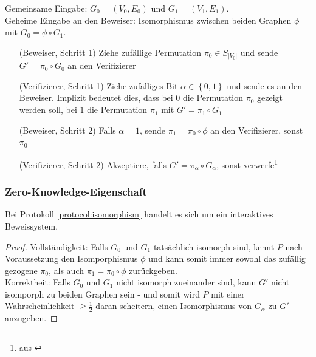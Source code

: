 \begin{protocol}[Graphenisomorphismus]
\label{protocol:isomorphism}
Gemeinsame Eingabe: \( G_0 = \left( V_0, E_0 \right) \) und \( G_1 = \left( V_1, E_1 \right) \).\\
Geheime Eingabe an den Beweiser: Isomorphismus zwischen beiden Graphen \( \phi \) mit \( G_0 = \phi \circ G_1 \).
\begin{itemize}
\item[(Beweiser, Schritt 1)] Ziehe zufällige Permutation \( \pi_0 \in S_{\left| V_0 \right| } \) und sende \( G' = \pi_0 \circ G_0 \) an den Verifizierer
\item[(Verifizierer, Schritt 1)] Ziehe zufälliges Bit \( \alpha \in \left\lbrace 0, 1 \right\rbrace \) und sende es an den Beweiser. Implizit bedeutet dies, dass bei \( 0 \) die Permutation \( \pi_0 \) gezeigt werden soll, bei \( 1 \) die Permutation \( \pi_1 \) mit \( G' = \pi_1 \circ G_1 \)
\item[(Beweiser, Schritt 2)] Falls \( \alpha = 1 \), sende \( \pi_1 = \pi_0 \circ \phi \) an den Verifizierer, sonst \( \pi_0 \)
\item[(Verifizierer, Schritt 2)] Akzeptiere, falls \( G' = \pi_\alpha \circ G_\alpha \), sonst verwerfe\footnote{aus \cite[Protocol 2]{np}}
\end{itemize}
\end{protocol}

\subsubsection{Zero-Knowledge-Eigenschaft}

\begin{theorem}
Bei Protokoll \ref{protocol:isomorphism} handelt es sich um ein interaktives Beweissystem.
\end{theorem}

\begin{proof}
Vollständigkeit: Falls \( G_0 \) und \( G_1 \) tatsächlich isomorph sind, kennt \( P \) nach Voraussetzung den Isomporphismus \( \phi \) und kann somit immer sowohl das zufällig gezogene \( \pi_0 \), als auch \( \pi_1 = \pi_0 \circ \phi \) zurückgeben. \\
Korrektheit: Falls \( G_0 \) und \( G_1 \) nicht isomorph zueinander sind, kann \( G' \) nicht isomporph zu beiden Graphen sein - und somit wird \( P \) mit einer Wahrscheinlichkeit \( \geq \frac{1}{2} \) daran scheitern, einen Isomorphismus von \( G_\alpha \) zu \( G' \) anzugeben.
\end{proof}

